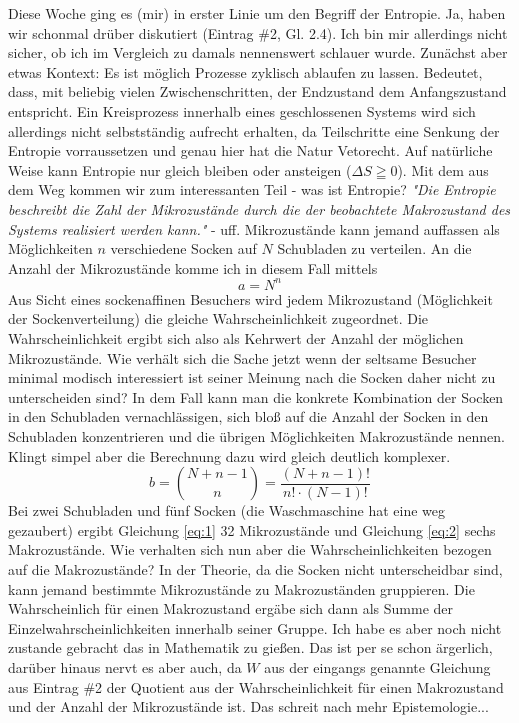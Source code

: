 Diese Woche ging es (mir) in erster Linie um den Begriff der Entropie. Ja, haben wir schonmal drüber diskutiert (Eintrag
\#2, Gl. 2.4). Ich bin mir allerdings nicht sicher, ob ich im Vergleich zu damals nennenswert schlauer wurde. Zunächst aber
etwas Kontext: Es ist möglich Prozesse zyklisch ablaufen zu lassen. Bedeutet, dass, mit beliebig vielen Zwischenschritten,
der Endzustand dem Anfangszustand entspricht. Ein Kreisprozess innerhalb eines geschlossenen Systems wird sich allerdings
nicht selbstständig aufrecht erhalten, da Teilschritte eine Senkung der Entropie vorraussetzen und genau hier hat die Natur
Vetorecht. Auf natürliche Weise kann Entropie nur gleich bleiben oder ansteigen (\(\Delta S \geqq 0\)). Mit dem aus dem Weg
kommen wir zum interessanten Teil - was ist Entropie?
\textit{"Die Entropie beschreibt die Zahl der Mikrozustände durch die der beobachtete Makrozustand des Systems realisiert werden kann."} - uff.
Mikrozustände kann jemand auffassen als Möglichkeiten \(n\) verschiedene Socken auf \(N\) Schubladen zu verteilen.
An die Anzahl der Mikrozustände komme ich in diesem Fall mittels
\begin{equation}
    a = N^n
    \label{eq:1}
\end{equation}
Aus Sicht eines sockenaffinen Besuchers wird jedem Mikrozustand (Möglichkeit der Sockenverteilung) die gleiche Wahrscheinlichkeit
zugeordnet. Die Wahrscheinlichkeit ergibt sich also als Kehrwert der Anzahl der möglichen Mikrozustände. Wie verhält sich
die Sache jetzt wenn der seltsame Besucher minimal modisch interessiert ist seiner Meinung nach die Socken daher nicht zu
unterscheiden sind? In dem Fall kann man die konkrete Kombination der Socken in den Schubladen vernachlässigen, sich
bloß auf die Anzahl der Socken in den Schubladen konzentrieren und die übrigen Möglichkeiten Makrozustände nennen.
Klingt simpel aber die Berechnung dazu wird gleich deutlich komplexer.
\begin{equation}
    b = \binom{N+n-1}{n} = \frac{(N+n-1)!}{n! \cdot (N-1)!}
    \label{eq:2}
\end{equation}
Bei zwei Schubladen und fünf Socken (die Waschmaschine hat eine weg gezaubert) ergibt Gleichung \ref{eq:1} 32 Mikrozustände
und Gleichung \ref{eq:2} sechs Makrozustände. Wie verhalten sich nun aber die Wahrscheinlichkeiten bezogen auf die
Makrozustände? In der Theorie, da die Socken nicht unterscheidbar sind, kann jemand bestimmte Mikrozustände zu Makrozuständen
gruppieren. Die Wahrscheinlich für einen Makrozustand ergäbe sich dann als Summe der Einzelwahrscheinlichkeiten innerhalb
seiner Gruppe. Ich habe es aber noch nicht zustande gebracht das in Mathematik zu gießen. Das ist per se schon ärgerlich,
darüber hinaus nervt es aber auch, da \(W\) aus der eingangs genannte Gleichung aus Eintrag \#2 der Quotient aus der
Wahrscheinlichkeit für einen Makrozustand und der Anzahl der Mikrozustände ist. Das schreit nach mehr Epistemologie...